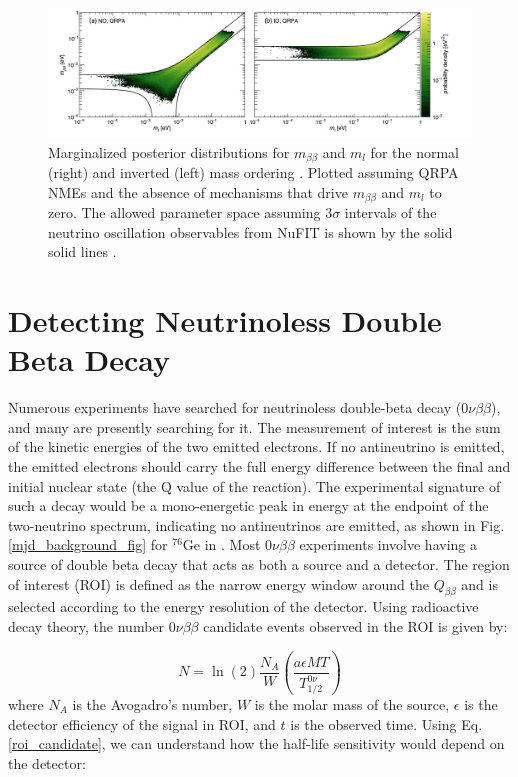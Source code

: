 \begin{figure}
\centering

\includegraphics[trim={0.6cm 0cm 1cm 0cm},clip,width=\linewidth]
{ch1/figs/benato_posterior.png}
\caption{Marginalized posterior distributions for $m_{\beta\beta}$ and $m_l$ for the normal (right) and inverted (left) mass ordering \cite{PhysRevD.96.053001}. Plotted assuming QRPA NMEs and the absence of mechanisms that drive $m_{\beta\beta}$ and $m_l$ to zero. The allowed parameter space assuming $3\sigma$ intervals of the neutrino oscillation observables from NuFIT is shown by the solid solid lines \cite{nufit}.}
\label{majorana_mass}
\end{figure}


\section{Detecting Neutrinoless Double Beta Decay}
Numerous experiments have searched for neutrinoless double-beta decay ($0\nu\beta\beta$), and many are presently searching for it. The measurement of interest is the sum of the kinetic energies of the two emitted electrons. If no antineutrino is emitted, the emitted electrons should carry the full energy difference between the final and initial nuclear state (the Q value of the reaction). The experimental signature of such a decay would be a mono-energetic peak in energy at the endpoint of the two-neutrino spectrum, indicating no antineutrinos are emitted, as shown in Fig. \ref{mjd_background_fig} for ${}^{76}\mathrm{Ge}$ in {\MJD}. Most $0\nu\beta\beta$ experiments involve having a source of double beta decay that acts as both a source and a detector. The region of interest (ROI) is defined as the narrow energy window around the $Q_{\beta\beta}$ and is selected according to the energy resolution of the detector. Using radioactive decay theory, the number $0\nu\beta\beta$ candidate events observed in the ROI is given by: %

\begin{equation}\label{roi_candidate}
N=\ln(2)\frac{N_A}{W}\left(\frac{a\epsilon MT}{T^{0\nu}_{1/2}}\right)
\end{equation}
where $N_A$ is the Avogadro's number, $W$ is the molar mass of the source, $\epsilon$ is the detector efficiency of the signal in ROI, and $t$ is the observed time. Using Eq. \ref{roi_candidate}, we can understand how the half-life sensitivity would depend on the detector:

